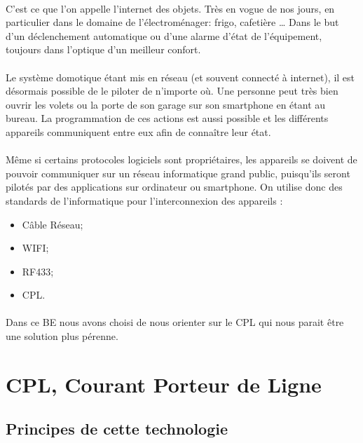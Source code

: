         \paragraph{}
C’est ce que l’on appelle l’internet des objets.
Très en vogue de nos jours, en particulier dans le domaine de l’électroménager: frigo, cafetière …
Dans le but d'un déclenchement automatique ou d'une alarme d'état de l'équipement, toujours dans l’optique d’un meilleur confort.
        \paragraph{}
Le système domotique étant mis en réseau (et souvent connecté à internet), il est désormais possible de le piloter de n’importe où.
Une personne peut très bien ouvrir les volets ou la porte de son garage sur son smartphone en étant au bureau.
La programmation de ces actions est aussi possible et les différents appareils communiquent entre eux afin de connaître leur état.
        \paragraph{}
Même si certains protocoles logiciels sont propriétaires, les appareils se doivent de pouvoir communiquer sur un réseau informatique grand public,
puisqu’ils seront pilotés par des applications sur ordinateur ou smartphone.
On utilise donc des standards de l’informatique pour l’interconnexion des appareils :
            \begin{itemize}
                \item Câble Réseau;
                \item WIFI;
                \item RF433;
                \item CPL.
            \end{itemize}
        \paragraph{}
Dans ce BE nous avons choisi de nous orienter sur le CPL qui nous parait être une solution plus pérenne.


    \section{CPL, Courant Porteur de Ligne}
        \subsection{Principes de cette technologie}
